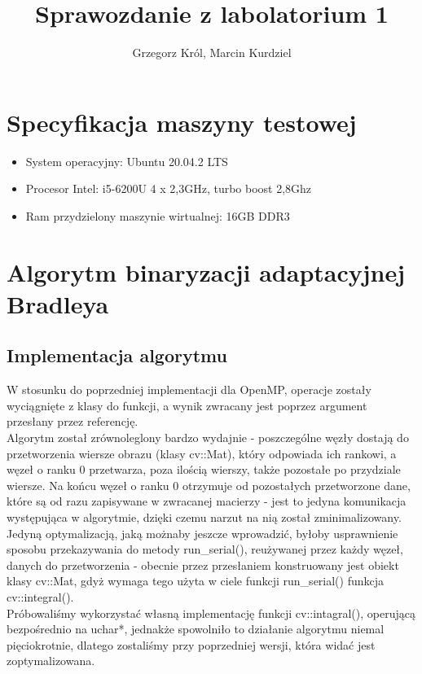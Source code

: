 \documentclass[12pt]{article}
\title{Sprawozdanie z labolatorium 1}
\author{Grzegorz Król, Marcin Kurdziel}
\begin{document}
 	\maketitle
 	\section{Specyfikacja maszyny testowej}
 		\begin{itemize}
 			\item System operacyjny: Ubuntu 20.04.2 LTS
 			\item Procesor Intel: i5-6200U 4 x 2,3GHz, turbo boost 2,8Ghz
 			\item Ram przydzielony maszynie wirtualnej: 16GB DDR3
 		\end{itemize}	
	\section{Algorytm binaryzacji adaptacyjnej Bradleya}
	
		\subsection{Implementacja algorytmu}
		W stosunku do poprzedniej implementacji dla OpenMP, operacje zostały wyciągnięte z klasy do funkcji, a wynik zwracany jest poprzez argument przesłany przez referencję. \\
			
Algorytm został zrównoleglony bardzo wydajnie - poszczególne węzły dostają do przetworzenia wiersze obrazu (klasy cv::Mat), który odpowiada ich rankowi, a węzeł o ranku 0 przetwarza, poza ilością wierszy, także pozostałe po przydziale wiersze. Na końcu węzeł o ranku 0 otrzymuje od pozostałych przetworzone dane, które są od razu zapisywane w zwracanej macierzy - jest to jedyna komunikacja występująca w algorytmie, dzięki czemu narzut na nią został zminimalizowany. \\
		
Jedyną optymalizacją, jaką możnaby jeszcze wprowadzić, byłoby usprawnienie sposobu przekazywania do metody run\_serial(), reużywanej przez każdy węzeł, danych do przetworzenia - obecnie przez przesłaniem konstruowany jest obiekt klasy cv::Mat, gdyż wymaga tego użyta w ciele funkcji run\_serial() funkcja cv::integral(). \\
		
Próbowaliśmy wykorzystać własną implementację funkcji cv::intagral(), operującą bezpośrednio na uchar*, jednakże spowolniło to działanie algorytmu niemal pięciokrotnie, dlatego zostaliśmy przy poprzedniej wersji, która widać jest zoptymalizowana. \\
		
\end{document}
